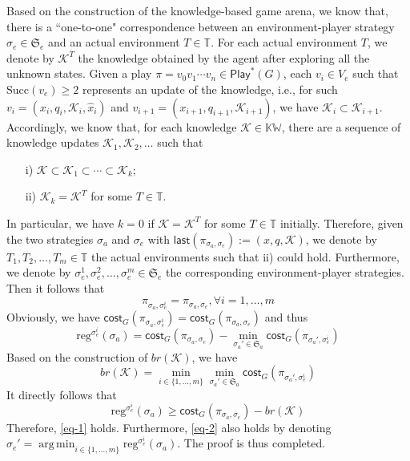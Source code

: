 \documentclass{ifacconf}
\DeclareMathOperator*{\argmin}{arg\,min}
\def \K{\mathcal{K}}
\def \last{\textsf{last}}
\def \reg{\text{reg}}
\def \succ{\text{Succ}}
\def \cost{\textsf{cost}}
\def \play{\textsf{Play}}
\def \S{\mathfrak{S}}
\def \T{\mathbb{T}}
\begin{document}
\begin{pf}
Based on the construction of the knowledge-based game arena, we know that, there is a ``one-to-one" correspondence between an environment-player strategy $\sigma_e\!\in\!\S_e$ and an actual environment $T\!\in\!\T$. For each actual environment $T$, we denote by $\K^T$ the knowledge obtained by the agent after exploring all the unknown states. Given a play $\pi=v_0v_1\!\cdots\! v_n\in\play^*(G)$, each $v_i\!\in\! V_e$ such that $\succ(v_e)\!\geq\! 2$ represents an update of the knowledge, i.e., for such $v_i\!=\!(x_i,q_i,\K_i,\hat{x}_i)$ and $v_{i+1}\!=\!(x_{i+1},q_{i+1},\K_{i+1})$, we have $\K_i\subset \K_{i+1}$. Accordingly, we know that, for each knowledge $\K\!\in\!\mathbb{KW}$, there are a sequence of knowledge updates $\K_1,\K_2,\ldots$ such that
\begin{itemize}
    \item[i)] $\K\subset\K_1\subset\cdots\subset \K_k$;
    \item[ii)] $\K_k=\K^T$ for some $T\in\T$.
\end{itemize}
In particular, we have $k\!=\!0$ if $\K\!=\!\K^T$ for some $T\!\in\!\T$ initially. Therefore, given the two strategies $\sigma_a$ and $\sigma_e$ with $\last(\pi_{\sigma_a,\sigma_e}):=(x,q,\K)$, we denote by $T_1,T_2,\ldots,T_m\!\in\!\T$ the actual environments such that ii) could hold. Furthermore, we denote by $\sigma_e^1,\sigma_e^2,\ldots,\sigma_e^m\!\in\!\S_e$ the corresponding environment-player strategies. Then it follows that 
\begin{equation}
    \pi_{\sigma_a,\sigma_e^i}=\pi_{\sigma_a,\sigma_e},\forall i\!=\!1,\ldots,m
\end{equation}
Obviously, we have $\cost_G(\pi_{\sigma_a,\sigma_e^i})\!=\!\cost_G(\pi_{\sigma_a,\sigma_e})$ and thus
\[
\reg^{\sigma_e^i}(\sigma_a)=\cost_G(\pi_{\sigma_a,\sigma_e})-\min_{\sigma_a'\in\S_a}\cost_G(\pi_{\sigma_a',\sigma_e^i})
\]
Based on the construction of $br(\K)$, we have
\begin{equation}
    br(\K)=\min_{i\in\{1,\ldots,m\}}\min_{\sigma_a'\in\S_a}\cost_G(\pi_{\sigma_a',\sigma_e^i})
\end{equation}
It directly follows that 
\begin{equation}
    \reg^{\sigma_e^i}(\sigma_a)\geq\cost_G(\pi_{\sigma_a,\sigma_e})-br(\K)
\end{equation}
Therefore, \eqref{eq-1} holds. Furthermore, \eqref{eq-2} also holds by denoting $\sigma_e'\!=\!\argmin_{i\in\{1,\ldots,m\}}\reg^{\sigma_e^i}(\sigma_a)$. The proof is thus completed.
\end{pf}
\end{document}
